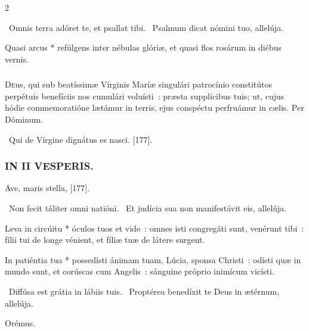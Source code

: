 \documentclass[9pt,twoside]{extarticle}
\begin{document}
\begin{multicols}{2}
\begin{tightlist}{}
\item {}~Omnis terra adóret te, et psallat tibi. ~Psalmum dicat nómini tuo, allelúja.
\item {} Quasi arcus * refúlgens inter nébulas glóriæ, et quasi flos rosárum in diébus vernis.
\end{tightlist}

\subsubsection*{\center {}}
\lettrine{D}eus, qui sub beatíssimæ Vírginis Maríæ singulári patrocínio constitútos perpétuis benefíciis nos cumulári voluísti~: præsta supplícibus tuis; ut, cujus hódie commemoratióne lætámur in terris, ejus conspéctu perfruámur in cælis. Per Dóminum.

\begin{tightlist}{}
\item {\small {}}
\item {\small {}}
\item {\small {}~Qui de Vírgine dignátus es nasci.  [177].}
\end{tightlist}

\subsubsection*{\center \textsc{IN II VESPERIS.}}
\begin{tightlist}{}
\item {\small {} Ave, maris stella,  [177].}
\item {}~Non fecit táliter omni natióni. ~Et judícia sua non manifestávit eis, allelúja.
\item {} Leva in circúitu * óculos tuos et vide~: omnes isti congregáti sunt, venérunt tibi~: fílii tui de longe vénient, et fíliæ tuæ de látere surgent.
\item {\small {}}
\item {} In patiéntia tua * possedísti ánimam tuam, Lúcia, sponsa Christi~: odísti quæ in mundo sunt, et corúscas cum Angelis~: sánguine próprio inimícum vicísti.
\item {}~Diffúsa est grátia in lábiis tuis. ~Proptérea benedíxit te Deus in ætérnum, allelúja.
\item Orémus. \hfill {}
\end{tightlist}


\end{multicols}
\end{document}
